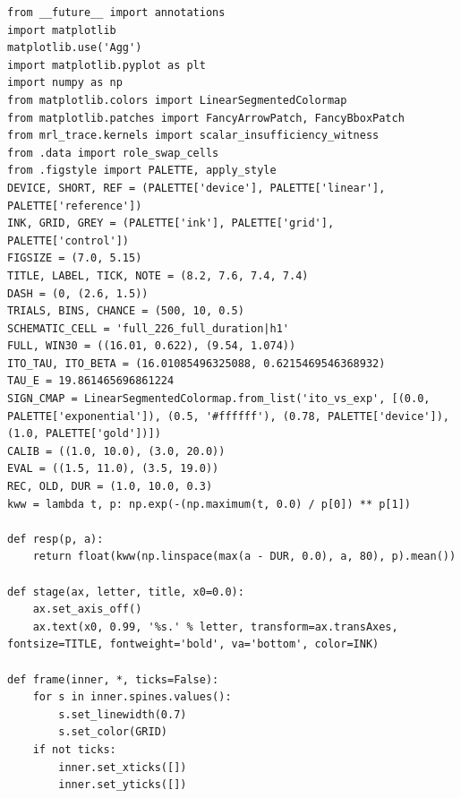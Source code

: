 \documentclass[a4paper,10pt]{article}
\begin{document}
\begin{Verbatim}
from __future__ import annotations
import matplotlib
matplotlib.use('Agg')
import matplotlib.pyplot as plt
import numpy as np
from matplotlib.colors import LinearSegmentedColormap
from matplotlib.patches import FancyArrowPatch, FancyBboxPatch
from mrl_trace.kernels import scalar_insufficiency_witness
from .data import role_swap_cells
from .figstyle import PALETTE, apply_style
DEVICE, SHORT, REF = (PALETTE['device'], PALETTE['linear'], PALETTE['reference'])
INK, GRID, GREY = (PALETTE['ink'], PALETTE['grid'], PALETTE['control'])
FIGSIZE = (7.0, 5.15)
TITLE, LABEL, TICK, NOTE = (8.2, 7.6, 7.4, 7.4)
DASH = (0, (2.6, 1.5))
TRIALS, BINS, CHANCE = (500, 10, 0.5)
SCHEMATIC_CELL = 'full_226_full_duration|h1'
FULL, WIN30 = ((16.01, 0.622), (9.54, 1.074))
ITO_TAU, ITO_BETA = (16.01085496325088, 0.6215469546368932)
TAU_E = 19.861465696861224
SIGN_CMAP = LinearSegmentedColormap.from_list('ito_vs_exp', [(0.0, PALETTE['exponential']), (0.5, '#ffffff'), (0.78, PALETTE['device']), (1.0, PALETTE['gold'])])
CALIB = ((1.0, 10.0), (3.0, 20.0))
EVAL = ((1.5, 11.0), (3.5, 19.0))
REC, OLD, DUR = (1.0, 10.0, 0.3)
kww = lambda t, p: np.exp(-(np.maximum(t, 0.0) / p[0]) ** p[1])

def resp(p, a):
    return float(kww(np.linspace(max(a - DUR, 0.0), a, 80), p).mean())

def stage(ax, letter, title, x0=0.0):
    ax.set_axis_off()
    ax.text(x0, 0.99, '%s.' % letter, transform=ax.transAxes, fontsize=TITLE, fontweight='bold', va='bottom', color=INK)

def frame(inner, *, ticks=False):
    for s in inner.spines.values():
        s.set_linewidth(0.7)
        s.set_color(GRID)
    if not ticks:
        inner.set_xticks([])
        inner.set_yticks([])


\end{Verbatim}
\end{document}
